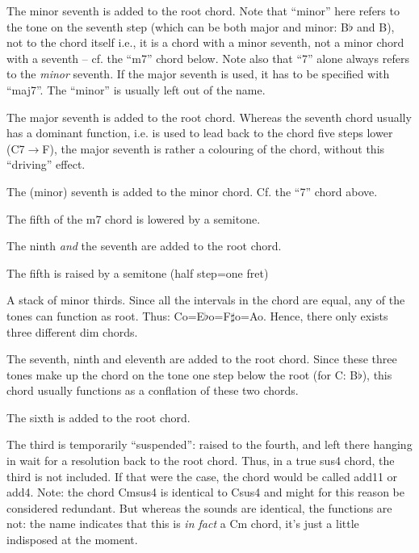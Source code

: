 \begin{articlelayout}
\begin{adjustwidth}{5em}{0em}

\noindent The minor seventh is added to the root chord. Note that
``minor'' here refers to the tone on the seventh step (which can be both
major and minor: B$\flat$ and B), not to the chord itself i.e., it is a chord
with a minor seventh, not a minor chord with a seventh -- cf. the ``m7'' chord
below. Note also that ``7'' alone always refers to the \emph{minor} seventh. If the
major seventh is used, it has to be specified with ``maj7''. The ``minor'' is usually left out of the name.

\noindent The major seventh is added to the root
chord. Whereas the seventh chord usually has a dominant function,
i.e. is used to lead back to the chord five steps lower (C7$\to$F), the
major seventh is rather a colouring of the chord, without this
``driving'' effect.

\noindent The (minor) seventh is added to the minor
chord. Cf. the ``7'' chord above.

\noindent The fifth of the m7 chord is lowered by a semitone.

\noindent The ninth \emph{and} the seventh are added to the root
chord.

\noindent The fifth is raised by a semitone (half
step=one fret)

\noindent A stack of minor thirds. Since all the intervals in the chord are
equal, any of the tones can function as root. Thus:
Co=E$\flat$o=F$\sharp$o=Ao. Hence, there only exists three different dim chords.

\noindent The seventh, ninth and eleventh are added to the
root chord. Since these three tones make up the chord on the tone one
step below the root (for C: B$\flat$), this chord usually functions as a
conflation of these two chords.

\noindent The sixth is added to the root chord.

\noindent The third is temporarily ``suspended'': raised to the fourth,
and left there hanging in wait for a resolution back to the root chord. Thus,
in a true sus4 chord, the third is not included. If that were the case,
the chord would be called add11 or add4. Note: the chord Cmsus4 is identical to Csus4 and might for this reason be considered redundant. But whereas the sounds are identical, the functions are not: the name indicates that this is \emph{in fact} a Cm chord, it's just a little indisposed at the moment.


\end{adjustwidth}
\end{articlelayout}
